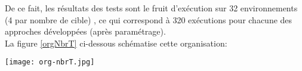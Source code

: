 De ce fait, les résultats des tests sont le fruit d'exécution sur 32 environnements (4 par nombre de cible) , ce qui correspond à 320 exécutions pour chacune des approches développées (après paramétrage).\\
La figure \ref{orgNbrT} ci-dessous schématise cette organisation:

\begin{center}	  
	\texttt{[image: org-nbrT.jpg]}%
	\vspace{-0.1 cm}
	\label{orgNbrT}%
\end{center}
